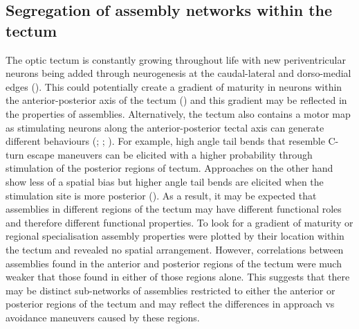 \subsection{Segregation of assembly networks within the tectum}
The optic tectum is constantly growing throughout life with new periventricular neurons being added through neurogenesis at the caudal-lateral and dorso-medial edges (\cite{Boulanger-Weill2019}). This could potentially create a gradient of maturity in neurons within the anterior-posterior axis of the tectum (\cite{Boulanger-Weill2017}) and this gradient may be reflected in the properties of assemblies. Alternatively, the tectum also contains a motor map as stimulating neurons along the anterior-posterior tectal axis can generate different behaviours (\cite{Herrero1998TailGoldfish}; \cite{Helmbrecht2018}; \cite{Fajardo2013ControlZebrafish.}). For example, high angle tail bends that resemble C-turn escape maneuvers can be elicited with a higher probability through stimulation of the posterior regions of tectum. Approaches on the other hand show less of a spatial bias but higher angle tail bends are elicited when the stimulation site is more posterior (\cite{Helmbrecht2018}). As a result, it may be expected that assemblies in different regions of the tectum may have different functional roles and therefore different functional properties. To look for a gradient of maturity or regional specialisation assembly properties were plotted by their location within the tectum and revealed no spatial arrangement. However, correlations between assemblies found in the anterior and posterior regions of the tectum were much weaker that those found in either of those regions alone. This suggests that there may be distinct sub-networks of assemblies restricted to either the anterior or posterior regions of the tectum and may reflect the differences in approach vs avoidance maneuvers caused by these regions. 

